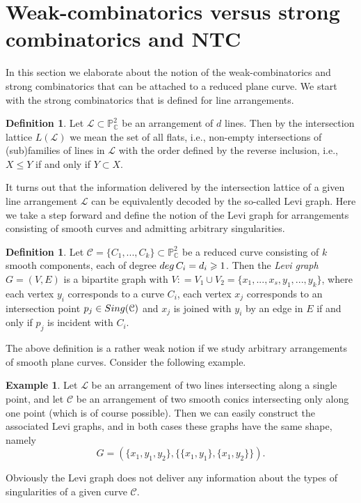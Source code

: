 \documentclass[12pt]{article}
\theoremstyle{plain}
\theoremstyle{definition}
\newtheorem{definition}[thm]{Definition}
\newtheorem{example}[thm]{Example}
\renewcommand\geq{\geqslant}
\renewcommand\leq{\leqslant}
\begin{document}
\section{Weak-combinatorics versus strong combinatorics and \textbf{NTC}}
In this section we elaborate about the notion of the weak-combinatorics and strong combinatorics that can be attached to a reduced plane curve. We start with the strong combinatorics that is defined for line arrangements.
\begin{definition}
Let $\mathcal{L} \subset \mathbb{P}^{2}_{\mathbb{C}}$ be an arrangement of $d$ lines. Then by the intersection lattice $L(\mathcal{L})$ we mean the set of all flats, i.e., non-empty intersections of (sub)families of lines in $\mathcal{L}$ with the order defined by the reverse inclusion, i.e., $X \leq Y$ if and only if $Y \subset X$.
\end{definition}
It turns out that the information delivered by the intersection lattice of a given line arrangement $\mathcal{L}$ can be equivalently decoded by the so-called Levi graph. Here we take a step forward and define the notion of the Levi graph for arrangements consisting of smooth curves and admitting arbitrary singularities.
\begin{definition}
Let $\mathcal{C} = \{C_{1}, ..., C_{k}\} \subset \mathbb{P}^{2}_{\mathbb{C}}$ be a reduced curve consisting of $k$ smooth components, each of degree ${\rm deg} \, C_{i} = d_{i} \geq 1$. Then the \emph{Levi graph} $G = (V,E)$ is a bipartite graph with  $V : = V_{1} \cup V_{2} = \{x_{1}, ..., x_{s}, y_{1}, ..., y_{k}\}$, where each vertex $y_{i}$ corresponds to a curve $C_{i}$, each vertex $x_{j}$ corresponds to an intersection point $p_{j} \in {\rm Sing}(\mathcal{C})$ and $x_{j}$ is joined with $y_{i}$ by an edge in $E$ if and only if $p_{j}$ is incident with $C_{i}$.  
\end{definition} 
The above definition is a rather weak notion if we study arbitrary arrangements of smooth plane curves. Consider the following example.
\begin{example}
Let $\mathcal{L}$ be an arrangement of two lines intersecting along a single point, and let $\mathcal{C}$ be an arrangement of two smooth conics intersecting only along one point (which is of course possible). Then we can easily construct the associated Levi graphs, and in both cases these graphs have the same shape, namely
$$G=(\{x_{1}, y_{1}, y_{2}\}, \{\{x_{1},y_{1}\}, \{x_{1},y_{2}\}\}).$$
\end{example}
Obviously the Levi graph does not deliver any information about the types of singularities of a given curve $\mathcal{C}$.
\end{document}
